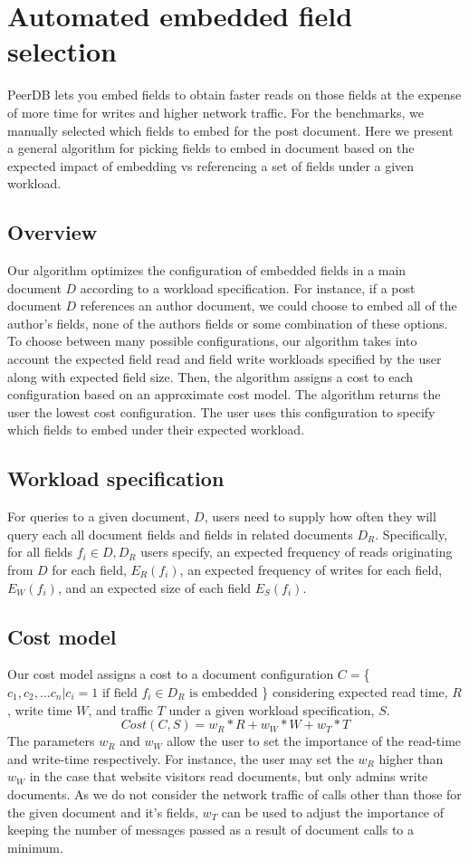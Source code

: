 \section{Automated embedded field selection}
PeerDB lets you embed fields to obtain faster reads on those fields at the expense of more time for writes and higher network traffic. 
For the benchmarks, we manually selected which fields to embed for the post document. 
Here we present a general algorithm for picking fields to embed in document based on the expected impact of embedding vs referencing a set of fields under a given workload.

\subsection{Overview}
Our algorithm optimizes the configuration of embedded fields in a main document $D$ according to a workload specification. 
For instance, if a post document $D$ references an author document, we could choose to embed all of the author's fields, none of the authors fields or some combination of these options. 
To choose between many possible configurations, our algorithm takes into account the expected field read and field write workloads specified by the user along with expected field size. 
Then, the algorithm assigns a cost to each configuration based on an approximate cost model. The algorithm returns the user the lowest cost configuration. 
The user uses this configuration to specify which fields to embed under their expected workload.

\subsection{Workload specification}
For queries to a given document, $D$, users need to supply how often they will query each all document fields and fields in related documents $D_R$. 
Specifically, for all fields $f_i \in D, D_R$ users specify, an expected frequency of reads originating from $D$ for each field, $E_R(f_i)$, an expected frequency of writes for each field, $E_W(f_i)$, and an expected size of each field $E_S(f_i)$. 

\subsection{Cost model}
Our cost model assigns a cost to a document configuration $C =$\{$c_1, c_2, ... c_n | c_i = 1 \text{ if field } f_i \in D_R \text{ is embedded }$\} considering expected read time, $R$, write time $W$, and traffic $T$ under a given workload specification, $S$.
$$Cost(C,S) = w_R*R + w_W*W + w_T*T$$ 
The parameters $w_R$ and $w_W$ allow the user to set the importance of the read-time and write-time respectively. 
For instance, the user may set the $w_R$ higher than $w_W$ in the case that website visitors read documents, but only admins write documents. 
As we do not consider the network traffic of calls other than those for the given document and it's fields, $w_T$ can be used to adjust the importance of keeping the number of messages passed as a result of document calls to a minimum.

